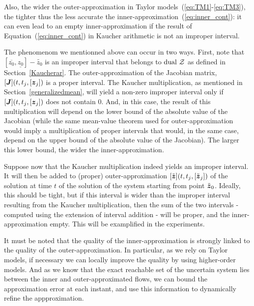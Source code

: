 \documentclass{sig-alternate-05-2015} %
\newcommand{\dual}{\mbox{dual }}
\begin{document}
Also, the wider the outer-approximation in Taylor models~(\ref{eq:TM1}-\ref{eq:TM3}), the tighter thus the less accurate the inner-approximation~(\ref{eq:inner_cont}): 
it can even  lead to an empty inner-approximation if the result of Equation~(\ref{eq:inner_cont}) in Kaucher arithmetic is not an improper interval. 

The phenomenom we mentionned above can occur in two ways. First, note that $[\overline{z_0},\underline{z_0}]-\tilde{z_0}$ is an improper interval that belongs to $\dual {\cal Z}$ as defined 
in Section~\ref{Kaucherar}. The outer-approximation of the Jacobian matrix,  $[\J](t,t_j,[{\z}_j])$ is a proper interval. The Kaucher multiplication, as mentioned 
in Section~\ref{generalizedmean},
will yield a non-zero improper interval only if$[\J](t,t_j,[{\z}_j])$ does not contain $0$. And, in this case, the result of this multiplication will depend on the 
lower bound of the absolute value of the Jacobian (while the same mean-value theorem used for outer-approximation would imply a multiplication of proper intervals that would, 
in the same case, depend on the upper bound of the absolute value of the Jacobian). The larger this lower bound, the wider the inner-approximation. 

Suppose now that the Kaucher multiplication indeed yields an improper interval. It will then be added to (proper) outer-approximation  $[\tilde{\z}](t,t_j,[\tilde{\z}_j])$ 
of the solution at time $t$ of the solution of the system starting from point $\tilde{\z}_0$. Ideally, this should be tight, but if this interval is wider than the improper 
interval resulting from the Kaucher multiplication, then the sum of the two intervals - computed using the extension of interval addition - will be proper, 
and the inner-approximation empty. This will be examplified in the experiments. 


It must be noted that the quality of the inner-approxima\-tion is strongly linked to the quality of the outer-approxima\-tion. 
In particular, as we rely on Taylor models, if necessary we can locally improve the quality by using higher-order models. 
And as we know that the exact reachable set of the uncertain system lies between the inner and outer-approximated flows, 
we can bound the approximation error at each instant, and use this information to dynamically refine the appproximation.  
\end{document}
